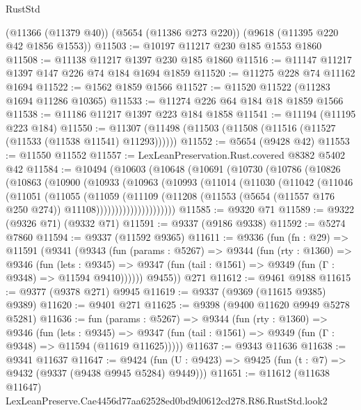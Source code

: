 \begin{lexlean}{RustStd}
\begin{coremodule}
    (@11366 (@11379 @40))
    (@5654 (@11386 @273 @220))
    (@9618 (@11395 @220 @42 @1856 @1553))
@11503 := @10197 @11217 @230 @185 @1553 @1860
@11508 := @11138 @11217 @1397 @230 @185 @1860
@11516 := @11147 @11217 @1397 @147 @226 @74 @184 @1694 @1859
@11520 := @11275 @228 @74 @11162 @1694
@11522 := @1562 @1859 @1566
@11527 := @11520 @11522 (@11283 @1694 @11286 @10365)
@11533 := @11274 @226 @64 @184 @18 @1859 @1566
@11538 := @11186 @11217 @1397 @223 @184 @1858
@11541 := @11194 (@11195 @223 @184)
@11550 := @11307 (@11498 (@11503 (@11508 (@11516 (@11527 (@11533 (@11538 @11541) @11293))))))
@11552 := @5654 (@9428 @42)
@11553 := @11550 @11552
@11557 := LexLeanPreservation.Rust.covered @8382 @5402 @42
@11584 := @10494
    (@10603
      (@10648
        (@10691
          (@10730
            (@10786
              (@10826
                (@10863
                  (@10900
                    (@10933
                      (@10963
                        (@10993
                          (@11014
                            (@11030
                              (@11042
                                (@11046
                                  (@11051
                                    (@11055
                                      (@11059
                                        (@11109
                                          (@11208
                                            (@11553
                                              (@5654 (@11557 @176 @250 @274))
                                              @11108)))))))))))))))))))))
@11585 := @9320 @71
@11589 := @9322 (@9326 @71) (@9332 @71)
@11591 := @9337 (@9186 @9338)
@11592 := @5274 @7860
@11594 := @9337 (@11592 @9365)
@11611 := @9336
    (fun (fn : @29) =>
    @11591
      (@9341
        (@9343
          (fun (params : @5267) =>
          @9344
            (fun (rty : @1360) =>
            @9346
              (fun (lets : @9345) =>
              @9347 (fun (tail : @1561) => @9349 (fun (Γ : @9348) => @11594 @9410))))))
        @9455))
    @271
@11612 := @9461 @9188
@11615 := @9377 (@9378 @271) @9945
@11619 := @9337 (@9369 (@11615 @9385) @9389)
@11620 := @9401 @271
@11625 := @9398 (@9400 @11620 @9949 @5278 @5281)
@11636 := fun (params : @5267) =>
  @9344
    (fun (rty : @1360) =>
    @9346
      (fun (lets : @9345) =>
      @9347 (fun (tail : @1561) => @9349 (fun (Γ : @9348) => @11594 (@11619 @11625)))))
@11637 := @9343 @11636
@11638 := @9341 @11637
@11647 := @9424 (fun (U : @9423) => @9425 (fun (t : @7) => @9432 (@9337 (@9438 @9945 @5284) @9449)))
@11651 := @11612 (@11638 @11647) LexLeanPreserve.Cae4456d77aa62528ed0bd9d0612cd278.R86.RustStd.look2

\end{coremodule}
\end{lexlean}
